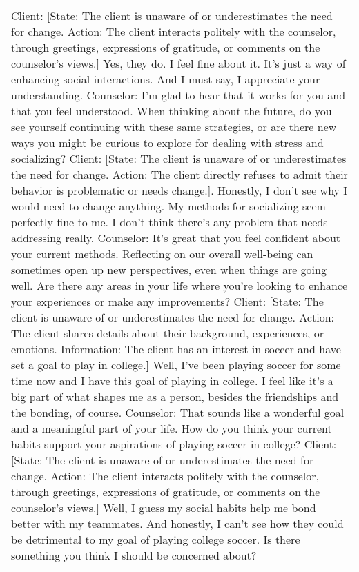\begin{table*}[tb]
\begin{tabularx}{\textwidth}{X}
\toprule
Client: {\color{blue} [State: The client is unaware of or underestimates the need for change. Action: The client interacts politely with the counselor, through greetings, expressions of gratitude, or comments on the counselor's views.]} Yes, they do. I feel fine about it. It's just a way of enhancing social interactions. And I must say, I appreciate your understanding. \newline
Counselor: I'm glad to hear that it works for you and that you feel understood. When thinking about the future, do you see yourself continuing with these same strategies, or are there new ways you might be curious to explore for dealing with stress and socializing?  \newline
Client: {\color{blue}[State: The client is unaware of or underestimates the need for change. Action: The client directly refuses to admit their behavior is problematic or needs change.].} Honestly, I don't see why I would need to change anything. My methods for socializing seem perfectly fine to me. I don't think there's any problem that needs addressing really. \newline
Counselor: It's great that you feel confident about your current methods. Reflecting on our overall well-being can sometimes open up new perspectives, even when things are going well. Are there any areas in your life where you’re looking to enhance your experiences or make any improvements?  \newline
Client: {\color{blue} [State: The client is unaware of or underestimates the need for change. Action: The client shares details about their background, experiences, or emotions. Information: The client has an interest in soccer and have set a goal to play in college.]} Well, I've been playing soccer for some time now and I have this goal of playing in college. I feel like it's a big part of what shapes me as a person, besides the friendships and the bonding, of course. \newline
Counselor: That sounds like a wonderful goal and a meaningful part of your life. How do you think your current habits support your aspirations of playing soccer in college?  \newline
Client: {\color{blue} [State: The client is unaware of or underestimates the need for change. Action: The client interacts politely with the counselor, through greetings, expressions of gratitude, or comments on the counselor's views.]} Well, I guess my social habits help me bond better with my teammates. And honestly, I can't see how they could be detrimental to my goal of playing college soccer. Is there something you think I should be concerned about? \newline

\end{tabularx}
\end{table*}

